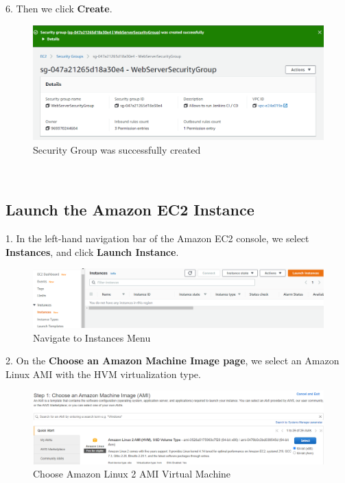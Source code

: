 \documentclass[12pt,a4paper,twoside]{article}
\begin{document}
6. Then we click \textbf{Create}.


\begin{figure}[H]
    \centering
        \includegraphics[width=15cm]{images-aws/3-create-sg-created.png}
        \caption{Security Group was successfully created}
\end{figure}


~\newpage

\subsection{Launch the Amazon EC2 Instance}


1. In the left-hand navigation bar of the Amazon EC2 console, we select \textbf{Instances}, and click \textbf{Launch Instance}.


\begin{figure}[H]
    \centering
        \includegraphics[width=15cm]{images-aws/4-instances.png}
        \caption{Navigate to Instances Menu}
\end{figure}


2. On the \textbf{Choose an Amazon Machine Image page}, we select an Amazon Linux AMI with the HVM virtualization type.


\begin{figure}[H]
    \centering
        \includegraphics[width=15cm]{images-aws/5-amazon-linux.png}
        \caption{Choose Amazon Linux 2 AMI Virtual Machine}
\end{figure}
\end{document}
